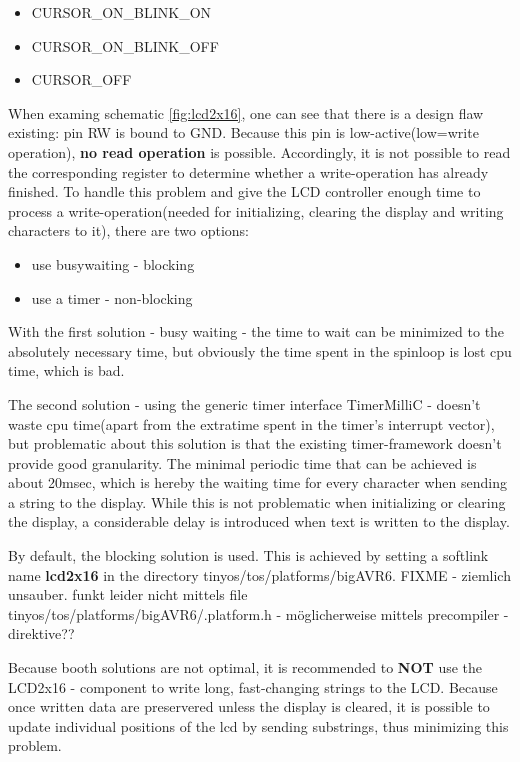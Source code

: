 \begin{itemize}
 \item CURSOR\_ON\_BLINK\_ON
 \item CURSOR\_ON\_BLINK\_OFF
 \item CURSOR\_OFF
\end{itemize}



When examing schematic \ref{fig:lcd2x16}, one can see that there is a design flaw existing: pin RW is bound to GND. Because this pin is low-active(low=write operation), \textbf{no read operation} is possible. Accordingly, it is not possible to read the corresponding register to determine whether a write-operation has already finished. To handle this problem and give the LCD controller enough time to process a write-operation(needed for initializing, clearing the display and writing characters to it), there are two options:

\begin{itemize}
 \item use busywaiting - blocking
 \item use a timer - non-blocking
\end{itemize}

With the first solution - busy waiting - the time to wait can be minimized to the absolutely necessary time, but obviously the time spent in the spinloop is lost cpu time, which is bad.

The second solution - using the generic timer interface TimerMilliC - doesn't waste cpu time(apart from the extratime spent in the timer's interrupt vector), but problematic about this solution is that the existing timer-framework doesn't provide good granularity. The minimal periodic time that can be achieved is about 20msec, which is hereby the waiting time for every character when sending a string to the display. While this is not problematic when initializing or clearing the display, a considerable delay is introduced when text is written to the display. 

By default, the blocking solution is used. This is achieved by setting a softlink name \textbf{lcd2x16} in the directory  tinyos/tos/platforms/bigAVR6. FIXME - ziemlich unsauber. funkt leider nicht mittels file tinyos/tos/platforms/bigAVR6/.platform.h -  möglicherweise mittels precompiler - direktive??

Because booth solutions are not optimal, it is recommended to \textbf{NOT} use the LCD2x16 - component to write long, fast-changing strings to the LCD. Because once written data are preservered unless the display is cleared, it is possible to update individual positions of the lcd by sending substrings, thus minimizing this problem.


